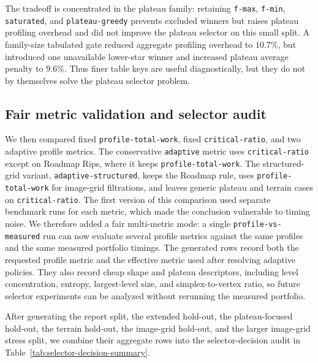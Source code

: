 \documentclass[11pt]{article}
\begin{document}
The tradeoff is concentrated in the plateau family: retaining \texttt{f-max},
\texttt{f-min}, \texttt{saturated}, and \texttt{plateau-greedy} prevents excluded winners
but raises plateau profiling overhead and did not improve the plateau selector on this
small split.  A family-size tabulated gate reduced aggregate profiling overhead to
$10.7\%$, but introduced one unavailable lower-star winner and increased plateau average
penalty to $9.6\%$.  Thus finer table keys are useful diagnostically, but they do not by
themselves solve the plateau selector problem.

\subsection{Fair metric validation and selector audit}
We then compared fixed \texttt{profile-total-work}, fixed \texttt{critical-ratio}, and two
adaptive profile metrics.  The conservative \texttt{adaptive} metric uses
\texttt{critical-ratio} except on Roadmap Rips, where it keeps
\texttt{profile-total-work}.  The structured-grid variant,
\texttt{adaptive-structured}, keeps the Roadmap rule, uses
\texttt{profile-total-work} for image-grid filtrations, and leaves generic plateau and
terrain cases on \texttt{critical-ratio}.  The first version of this comparison used
separate benchmark runs for each metric, which made the conclusion vulnerable to timing
noise.  We therefore added a fair multi-metric mode: a single
\texttt{profile-vs-measured} run can now evaluate several profile metrics against the same
profiles and the same measured portfolio timings.  The generated rows record both the
requested profile metric and the effective metric used after resolving adaptive policies.
They also record cheap shape and plateau descriptors, including level concentration,
entropy, largest-level size, and simplex-to-vertex ratio, so future selector experiments
can be analyzed without rerunning the measured portfolio.





After generating the report split, the extended hold-out, the plateau-focused hold-out,
the terrain hold-out, the image-grid hold-out, and the larger image-grid stress split, we
combine their aggregate rows into the selector-decision audit in
Table~\ref{tab:selector-decision-summary}.


\end{document}

